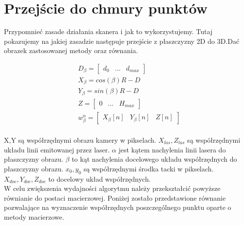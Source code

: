 \section{Przejście do chmury punktów}
Przypomnieć zasade działania skanera i jak to wykorzystujemy. Tutaj pokazujemy na jakiej zasadzie następuje przejście z płaszczyzny 2D do 3D.Dać obrazek zastosowanej metody oraz równania.

\begin{equation}
    \begin{aligned}
            & D_{\beta}=\begin{bmatrix}d_{0} & \dots & d_{max} \end{bmatrix}  \\
            & X_{\beta}=cos(\beta)R-D  \\
            & Y_{\beta}=sin(\beta)R-D  \\
          & Z=\begin{bmatrix} 0 & \dots & H_{max} \end{bmatrix}  \\
          & w_{\beta}^n=\begin{bmatrix} X_{\beta}[n] & Y_{\beta}[n] & Z[n] \end{bmatrix}  \\
    \end{aligned}
\end{equation}

X,Y są współrzędnymi obrazu kamery w pikselach. $X_{las},Z_{las}$ są współrzędnymi układu linii emitowanej przez laser. $\alpha$ jest kątem nachylenia linii lasera do płaszczyzny obrazu. $\beta$ to kąt nachylenia docelowego układu współrzędnych do płaszczyzny obrazu. $x_{0},y_{0}$ są współrzędnymi środka tacki w pikselach. $X_{doc},Y_{doc},Z_{doc}$ to docelowy układ współrzędnych.\\

W celu zwiększenia wydajności algorytmu należy przekształcić powyższe równianie do postaci macierzowej.
Poniżej zostało przedstawione równanie pozwalające na wyznaczenie współrzędnych poszczególnego punktu oparte o metody macierzowe. 